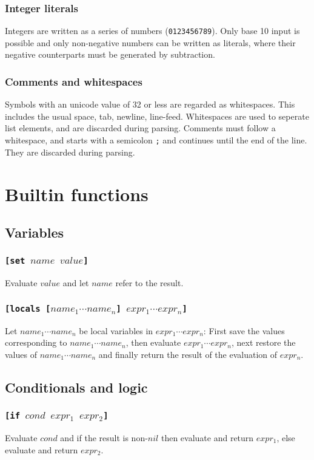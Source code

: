 \subsubsection{Integer literals}
Integers are written as a series of numbers (\verb|0123456789|). Only base 10 input is possible and only non-negative numbers can be written as literals, where their negative counterparts must be generated by subtraction.

\subsubsection{Comments and whitespaces}
Symbols with an unicode value of 32 or less are regarded as whitespaces. This includes the usual space, tab, newline, line-feed. Whitespaces are used to seperate list elements, and are discarded during parsing.
Comments must follow a whitespace, and starts with a semicolon \verb|;| and continues until the end of the line. They are discarded during parsing. 

\section{Builtin functions}
\subsection{Variables}
\subsubsection{\tt{[set }$name$ $value$\tt{]}}
Evaluate $value$ and let $name$ refer to the result.

\subsubsection{\tt{[locals [}$name_1 \cdots name_n$\tt{]} $expr_1 \cdots expr_n$\tt{]}}
Let $name_1 \cdots name_n$ be local variables in $expr_1 \cdots expr_n$: First save the values corresponding to $name_1 \cdots name_n$, then evaluate $expr_1 \cdots expr_n$, next restore the values of $name_1 \cdots name_n$ and finally return the result of the evaluation of $expr_n$.

\subsection{Conditionals and logic}
\subsubsection{\tt{[if }$cond$ $expr_1$ $expr_2$\tt{]}}
Evaluate $cond$ and if the result is non-$nil$ then evaluate and return $expr_1$, else evaluate and return $expr_2$.

